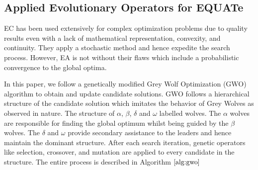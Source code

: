 \documentclass[conference]{IEEEtran}
\begin{document}
\subsection{Applied Evolutionary Operators for EQUATe}

EC has been used extensively for complex optimization problems due to quality results even with a lack of mathematical representation, convexity, and continuity. They apply a stochastic method and hence expedite the search process. However, EA is not without their flaws which include a probabilistic convergence to the global optima. 

In this paper, we follow a genetically modified Grey Wolf Optimization (GWO) algorithm \cite{gwo} to obtain and update candidate solutions. GWO follows a hierarchical structure of the candidate solution which imitates the behavior of Grey Wolves as observed in nature. The structure of $\alpha$, $\beta$, $\delta$ and $\omega$ labelled wolves. The $\alpha$ wolves are responsible for finding the global optimum whilst being guided by the $\beta$ wolves. The $\delta$ and $\omega$ provide secondary assistance to the leaders and hence maintain the dominant structure. After each search iteration, genetic operators like selection, crossover, and mutation are applied to every candidate in the structure. The entire process is described in Algorithm $\ref{alg:gwo}$
\end{document}
